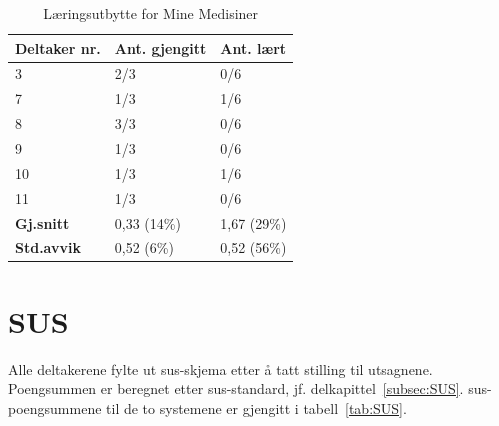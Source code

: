 \begin{table}[H]
    \centering
    \begin{tabular}{ | p{2.6cm} | p{2.6cm} | p{2.6cm} | }
      \hline
       \textbf{Deltaker nr.} & \textbf{Ant. gjengitt}   & \textbf{Ant. lært}\\ \hline
        3 & 2/3 & 0/6\\ \hline
        7 & 1/3  & 1/6\\ \hline
        8 & 3/3 & 0/6\\ \hline
        9 & 1/3  & 0/6\\ \hline
        10 & 1/3  & 1/6 \\ \hline
        11 & 1/3 & 0/6\\ \hline
        \textbf{Gj.snitt} & 0,33 (14\%) & 1,67 (29\%) \\ \hline
        \textbf{Std.avvik} & 0,52 (6\%) & 0,52 (56\%) \\ \hline
    \end{tabular}
    \caption{Læringsutbytte for Mine Medisiner}
    \label{tab:LaeringsMed}
\end{table}

\section{SUS}
Alle deltakerene fylte ut \acrshort{sus}-skjema etter å tatt stilling til utsagnene. Poengsummen er beregnet etter \acrshort{sus}-standard, jf. delkapittel~\ref{subsec:SUS}. \acrshort{sus}-poengsummene til de to systemene er gjengitt i tabell~\ref{tab:SUS}.

